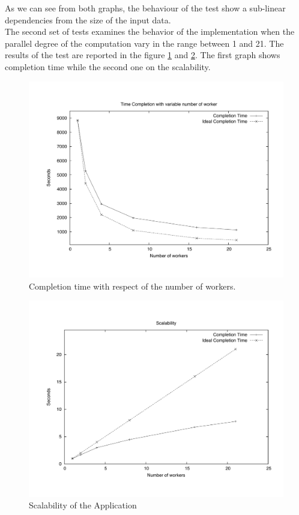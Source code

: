 As we can see from both graphs, the behaviour of the test show a sub-linear dependencies from the size of the input data. \\

The second set of tests examines the behavior of the implementation when the parallel degree of the computation vary in the range between 1 and 21. 
The results of the test are reported in the figure \ref{NTime}  and \ref{NScal}. 
The first graph shows completion time while the second one on the scalability.

\begin{figure}[th]
	\centerline{
		\mbox{\includegraphics[scale=0.48]{HadoopTest/PsFiles/NTime.pdf}}
	}
	\caption{Completion time with respect of the number of workers.} 
        \label{NTime}
\end{figure}

\begin{figure}[th]
	\centerline{
		\mbox{\includegraphics[scale=0.48]{HadoopTest/PsFiles/NScal.pdf}}
	}
	\caption{Scalability of the Application} 
        \label{NScal}
\end{figure}

